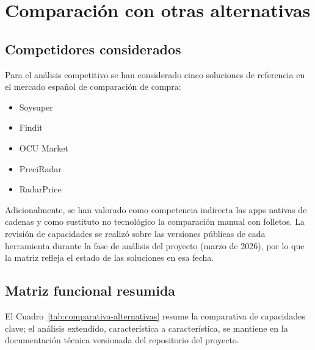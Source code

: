 \chapter{Comparaci\'on con otras alternativas}\label{alternativas}

\section{Competidores considerados}

Para el an\'alisis competitivo se han considerado cinco soluciones de referencia en el
mercado espa\~nol de comparaci\'on de compra:

\begin{itemize}
	\item Soysuper \cite{soysuper_web}
	\item Findit
	\item OCU Market \cite{ocu_web}
	\item PreciRadar
	\item RadarPrice
\end{itemize}

Adicionalmente, se han valorado como competencia indirecta las apps nativas de cadenas
y como sustituto no tecnol\'ogico la comparaci\'on manual con folletos. La revisi\'on de
capacidades se realiz\'o sobre las versiones p\'ublicas de cada herramienta durante la fase
de an\'alisis del proyecto (marzo de 2026), por lo que la matriz refleja el estado de las
soluciones en esa fecha.

\section{Matriz funcional resumida}

El Cuadro~\ref{tab:comparativa-alternativas} resume la comparativa de capacidades clave;
el an\'alisis extendido, caracter\'istica a caracter\'istica, se mantiene en la
documentaci\'on t\'ecnica versionada del repositorio del proyecto.

